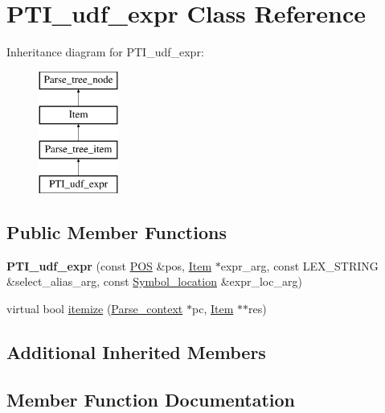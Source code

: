 \hypertarget{classPTI__udf__expr}{}\section{P\+T\+I\+\_\+udf\+\_\+expr Class Reference}
\label{classPTI__udf__expr}
Inheritance diagram for P\+T\+I\+\_\+udf\+\_\+expr\+:\begin{figure}[H]
\begin{center}
\leavevmode
\includegraphics[height=4.000000cm]{classPTI__udf__expr}
\end{center}
\end{figure}
\subsection*{Public Member Functions}
\begin{DoxyCompactItemize}
\item 
\mbox{\label{classPTI__udf__expr_aa3aa8d64d33d725e1abe3f0c91727def}} 
{\bfseries P\+T\+I\+\_\+udf\+\_\+expr} (const \mbox{\hyperlink{structYYLTYPE}{P\+OS}} \&pos, \mbox{\hyperlink{classItem}{Item}} $\ast$expr\+\_\+arg, const L\+E\+X\+\_\+\+S\+T\+R\+I\+NG \&select\+\_\+alias\+\_\+arg, const \mbox{\hyperlink{structSymbol__location}{Symbol\+\_\+location}} \&expr\+\_\+loc\+\_\+arg)
\item 
virtual bool \mbox{\hyperlink{classPTI__udf__expr_abccd7283f1cf0fb7bbe2d4c04d1f1934}{itemize}} (\mbox{\hyperlink{structParse__context}{Parse\+\_\+context}} $\ast$pc, \mbox{\hyperlink{classItem}{Item}} $\ast$$\ast$res)
\end{DoxyCompactItemize}
\subsection*{Additional Inherited Members}


\subsection{Member Function Documentation}
\mbox{\label{classPTI__udf__expr_abccd7283f1cf0fb7bbe2d4c04d1f1934}} 
